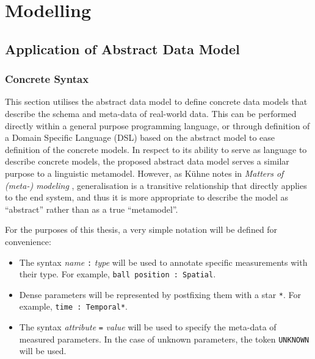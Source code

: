 \openchapterblock

\chapter{Modelling}
\label{appendix:modelling}

\section{Application of Abstract Data Model}

\subsection{Concrete Syntax}\label{concrete-syntax}

This section utilises the abstract data model to define concrete data models
that describe the schema and meta-data of real-world data. This can be performed
directly within a general purpose programming language, or through definition of a
Domain Specific Language (DSL) based on the abstract model to ease definition of the
concrete models. In respect to its ability to serve as language to describe concrete models,
the proposed abstract data model serves a similar purpose to a linguistic metamodel.
However, as K{\"{u}}hne notes in \textit{Matters of (meta-) modeling} \cite{Kuhne2006},
generalisation is a transitive relationship that directly applies to the end system,
and thus it is more appropriate to describe the model as ``abstract'' rather than as a true ``metamodel''.

For the purposes of this thesis, a very simple notation will be defined
for convenience:

\begin{itemize}
\item
  The syntax \emph{name} \texttt{:} \emph{type} will be used to annotate
  specific measurements with their type. For example,
  \texttt{ball\ position\ :\ Spatial}.
\item
  Dense parameters will be represented by postfixing them with a star
  \texttt{*}. For example, \texttt{time\ :\ Temporal*}.
\item
  The syntax \emph{attribute} \texttt{=} \emph{value} will be used to
  specify the meta-data of measured parameters. In the case of unknown
  parameters, the token \texttt{UNKNOWN} will be used.
\end{itemize}

